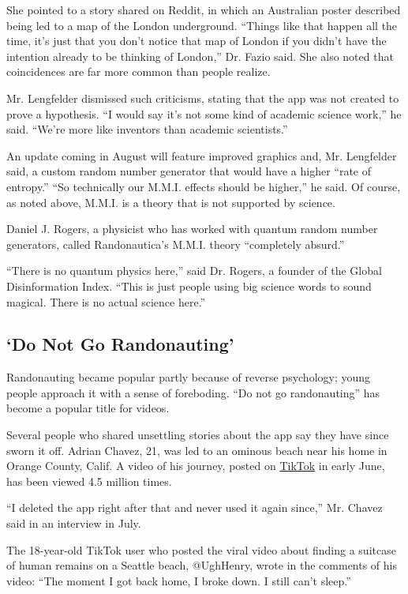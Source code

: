 She pointed to a story shared on Reddit, in which an Australian poster
described being led to a map of the London underground. ``Things like
that happen all the time, it's just that you don't notice that map of
London if you didn't have the intention already to be thinking of
London,'' Dr. Fazio said. She also noted that coincidences are far more
common than people realize.

Mr. Lengfelder dismissed such criticisms, stating that the app was not
created to prove a hypothesis. ``I would say it's not some kind of
academic science work,'' he said. ``We're more like inventors than
academic scientists.''

An update coming in August will feature improved graphics and, Mr.
Lengfelder said, a custom random number generator that would have a
higher ``rate of entropy.'' ``So technically our M.M.I. effects should
be higher,'' he said. Of course, as noted above, M.M.I. is a theory that
is not supported by science.

Daniel J. Rogers, a physicist who has worked with quantum random number
generators, called Randonautica's M.M.I. theory ``completely absurd.''

``There is no quantum physics here,'' said Dr. Rogers, a founder of the
Global Disinformation Index. ``This is just people using big science
words to sound magical. There is no actual science here.''

\hypertarget{do-not-go-randonauting}{%
\subsection{`Do Not Go Randonauting'}\label{do-not-go-randonauting}}

Randonauting became popular partly because of reverse psychology; young
people approach it with a sense of foreboding. ``Do not go
randonauting'' has become a popular title for videos.

Several people who shared unsettling stories about the app say they have
since sworn it off. Adrian Chavez, 21, was led to an ominous beach near
his home in Orange County, Calif. A video of his journey, posted on
\href{https://vm.tiktok.com/JF1tNLR/}{TikTok} in early June, has been
viewed 4.5 million times.

``I deleted the app right after that and never used it again since,''
Mr. Chavez said in an interview in July.

The 18-year-old TikTok user who posted the viral video about finding a
suitcase of human remains on a Seattle beach, @UghHenry, wrote in the
comments of his video: ``The moment I got back home, I broke down. I
still can't sleep.''

